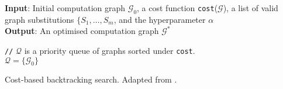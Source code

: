 {\SetAlgoNoLine
\begin{algorithm}[H]
 \textbf{Input}: Initial computation graph $\mathcal{G}_0$, a cost function \texttt{cost}($\mathcal{G}$), a list of valid graph substitutions $\lbrace S_1, \dots, S_m$, and the hyperparameter $\alpha$ \\

 \textbf{Output}: An optimised computation graph $\mathcal{G}^*$

 \texttt{//} $\mathcal{Q}$ is a priority queue of graphs sorted under \texttt{cost}.\\
 $\mathcal{Q} = \lbrace \mathcal{G}_0 \rbrace$


 \caption{Cost-based backtracking search. Adapted from \cite{jia2019taso}.}
 \label{algo:taso}
\end{algorithm}}
